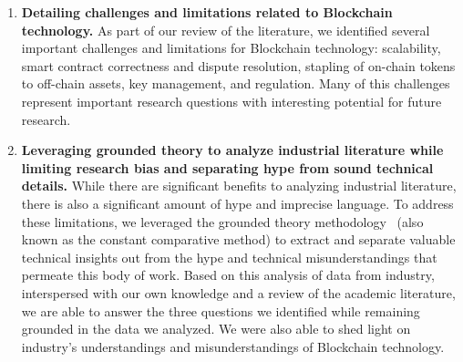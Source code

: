 \begin{enumerate}
	\item \textbf{Detailing challenges and limitations related to Blockchain technology.}
	As part of our review of the literature, we identified several important challenges and limitations for Blockchain technology: scalability, smart contract correctness and dispute resolution, stapling of on-chain tokens to off-chain assets, key management, and regulation.
	Many of this challenges represent important research questions with interesting potential for future research.


	\item \textbf{Leveraging grounded theory to analyze industrial literature while limiting research bias and separating hype from sound technical details.}
	While there are significant benefits to analyzing industrial literature, there is also a significant amount of hype and imprecise language.
	To address these limitations, we leveraged the grounded theory methodology~\cite{glaser1965constant,strauss1990basics,corbin1990grounded} (also known as the constant comparative method) to extract and separate valuable technical insights out from the hype and technical misunderstandings that permeate this body of work.
	Based on this analysis of data from industry, interspersed with our own knowledge and a review of the academic literature, we are able to answer the three questions we identified while remaining grounded in the data we analyzed.
	We were also able to shed light on industry's understandings and misunderstandings of Blockchain technology. 
	
	
\end{enumerate}
